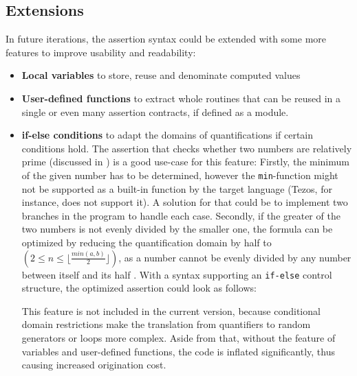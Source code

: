 \subsection{Extensions}\label{sec:ext}
In future iterations, the assertion syntax could be extended with some more features to improve usability and readability:
\begin{itemize}
\item \textbf{Local variables} to store, reuse and denominate computed values
\item \textbf{User-defined functions} to extract whole routines that can be reused in a single or even many assertion contracts, if defined as a module.
\item \textbf{if-else conditions} to adapt the domains of quantifications if certain conditions hold. The assertion that checks whether two numbers are relatively prime (discussed in ) is a good use-case for this feature: Firstly, the minimum of the given number has to be determined, however the \texttt{min}-function might not be supported as a built-in function by the target language (Tezos, for instance, does not support it). A solution for that could be to implement two branches in the program to handle each case. Secondly, if the greater of the two numbers is not evenly divided by the smaller one, the formula can be optimized by reducing the quantification domain by half to $(2 \le n \le \lfloor \frac{min(a,b)}{2} \rfloor)$, as a number cannot be evenly divided by any number between itself and its half \cite{bernhardt_veigel_2020}. With a syntax supporting an \texttt{if-else} control structure, the optimized assertion could look as follows:

This feature is not included in the current version, because conditional domain restrictions make the translation from quantifiers to random generators or loops more complex. Aside from that, without the feature of variables and user-defined functions, the code is inflated significantly, thus causing increased origination cost.
\end{itemize}

